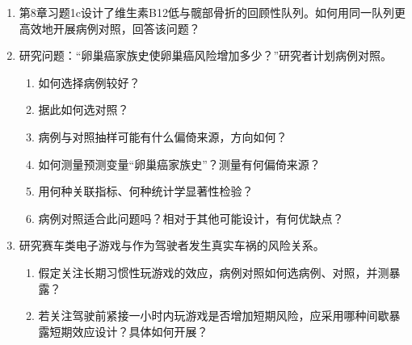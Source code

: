 \begin{enumerate}
\item 第8章习题1c设计了维生素B12低与髋部骨折的回顾性队列。如何用同一队列更高效地开展病例对照，回答该问题？
\item 研究问题：“卵巢癌家族史使卵巢癌风险增加多少？”研究者计划病例对照。
\begin{enumerate}
\item 如何选择病例较好？
\item 据此如何选对照？
\item 病例与对照抽样可能有什么偏倚来源，方向如何？
\item 如何测量预测变量“卵巢癌家族史”？测量有何偏倚来源？
\item 用何种关联指标、何种统计学显著性检验？
\item 病例对照适合此问题吗？相对于其他可能设计，有何优缺点？
\end{enumerate}
\item 研究赛车类电子游戏与作为驾驶者发生真实车祸的风险关系。
\begin{enumerate}
\item 假定关注长期习惯性玩游戏的效应，病例对照如何选病例、对照，并测暴露？
\item 若关注驾驶前紧接一小时内玩游戏是否增加短期风险，应采用哪种间歇暴露短期效应设计？具体如何开展？
\end{enumerate}
\end{enumerate}

\endgroup

